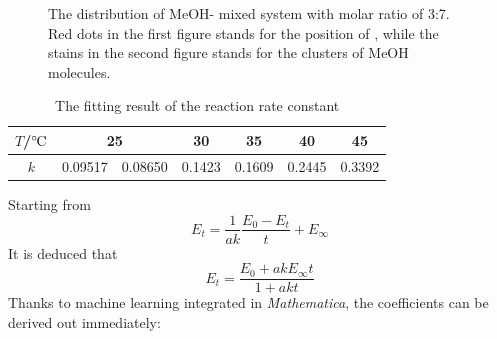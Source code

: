 \documentclass[%
 reprint,
 amsmath,amssymb,
 aps,
10.5pt,
]{revtex4-1}
\newcommand{\celsius}{\ensuremath{^\circ\hspace{-0.09em}\mathrm{C}}}
\begin{document}
\begin{figure}
\centering
{}
\caption{The distribution of MeOH- mixed system with molar ratio of 3:7. Red dots in the first figure stands for the position of , while the stains in the second figure stands for the clusters of MeOH molecules.}
\label{MeOH}
\end{figure}
\begin{table}
\caption{The fitting result of the reaction rate constant}
\begin{tabular}{|c|c|c|c|c|c|c|}\hline
$T$/\celsius & \multicolumn{2}{c|}{25} & 30 & 35 & 40 & 45 \\\hline
$k$ & 0.09517 & 0.08650 & 0.1423 & 0.1609 & 0.2445 & 0.3392 \\\hline
\end{tabular}
\label{data}
\end{table}
Starting from
\begin{equation}
	E_t = \frac{1}{ak}\frac{E_0-E_t}{t} + E_\infty
\end{equation}
It is deduced that
\begin{equation}
	E_t = \frac{E_0 + ak E_\infty t}{1+ a k t}
\end{equation}
Thanks to machine learning integrated in \emph{Mathematica}, the coefficients can be derived out immediately:
\end{document}
